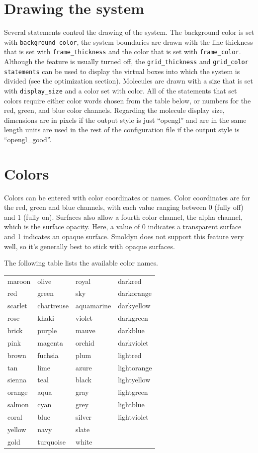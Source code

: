 \documentclass {scrbook}
\newcommand {\ttt} {\texttt}
\begin{document}
\section{Drawing the system}

Several statements control the drawing of the system. The background color is set with \ttt{background\_color}, the system boundaries are drawn with the line thickness that is set with \ttt{frame\_thickness} and the color that is set with \ttt{frame\_color}. Although the feature is usually turned off, the \ttt{grid\_thickness} and \ttt{grid\_color statements} can be used to display the virtual boxes into which the system is divided (see the optimization section). Molecules are drawn with a size that is set with \ttt{display\_size} and a color set with color. All of the statements that set colors require either color words chosen from the table below, or numbers for the red, green, and blue color channels. Regarding the molecule display size, dimensions are in pixels if the output style is just ``opengl'' and are in the same length units are used in the rest of the configuration file if the output style is ``opengl\_good''.

\section{Colors}

Colors can be entered with color coordinates or names. Color coordinates are for the red, green and blue channels, with each value ranging between 0 (fully off) and 1 (fully on). Surfaces also allow a fourth color channel, the alpha channel, which is the surface opacity. Here, a value of 0 indicates a transparent surface and 1 indicates an opaque surface. Smoldyn does not support this feature very well, so it's generally best to stick with opaque surfaces.

The following table lists the available color names.

\begin{longtable}[c]{llll}
maroon & olive & royal & darkred\\
red & green & sky & darkorange\\
scarlet & chartreuse & aquamarine & darkyellow\\
rose & khaki & violet & darkgreen\\
brick & purple & mauve & darkblue\\
pink & magenta & orchid & darkviolet\\
brown & fuchsia & plum & lightred\\
tan & lime & azure & lightorange\\
sienna & teal & black & lightyellow\\
orange & aqua & gray & lightgreen\\
salmon & cyan & grey & lightblue\\
coral & blue & silver & lightviolet\\
yellow & navy & slate\\
gold & turquoise & white\\
\end{longtable}
\end{document}
